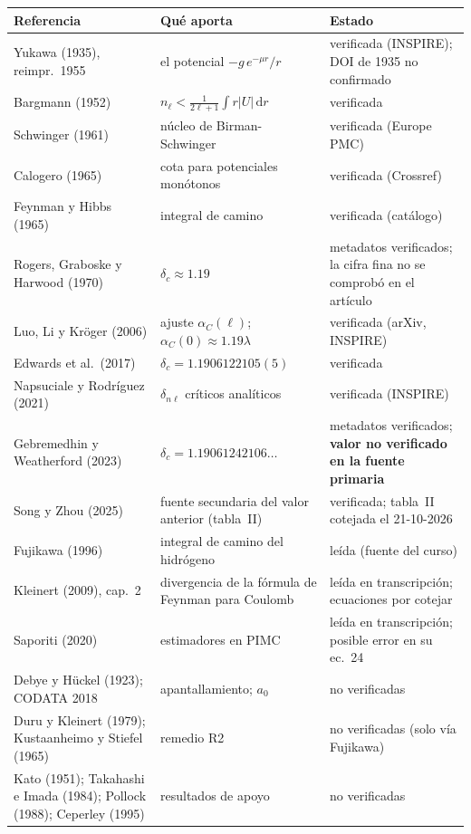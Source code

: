 \documentclass[11pt]{article}
\newcommand{\dd}{\mathrm{d}}
\newcommand{\dc}{\delta_c}
\begin{document}
\begin{longtable}{@{}L{5.4cm}L{4.2cm}L{4.0cm}@{}}
\toprule
\textbf{Referencia} & \textbf{Qué aporta} & \textbf{Estado}\\
\midrule
\endhead
Yukawa (1935), reimpr.\ 1955 \cite{Yukawa1935} & el potencial $-g\,e^{-\mu r}/r$ & verificada (INSPIRE); DOI de 1935 no confirmado\\
Bargmann (1952) \cite{Bargmann1952} & $n_\ell<\frac{1}{2\ell+1}\int r|U|\,\dd r$ & verificada\\
Schwinger (1961) \cite{Schwinger1961} & núcleo de Birman-Schwinger & verificada (Europe PMC)\\
Calogero (1965) \cite{Calogero1965} & cota para potenciales monótonos & verificada (Crossref)\\
Feynman y Hibbs (1965) \cite{FeynmanHibbs1965} & integral de camino & verificada (catálogo)\\
Rogers, Graboske y Harwood (1970) \cite{Rogers1970} & $\dc\approx1.19$ & metadatos verificados; la cifra fina no se comprobó en el artículo\\
Luo, Li y Kröger (2006) \cite{Luo2006} & ajuste $\alpha_C(\ell)$; $\alpha_C(0)\approx1.19\lambda$ & verificada (arXiv, INSPIRE)\\
Edwards et al.\ (2017) \cite{Edwards2017} & $\dc=1.1906122105(5)$ & verificada\\
Napsuciale y Rodríguez (2021) \cite{Napsuciale2021} & $\delta_{n\ell}$ críticos analíticos & verificada (INSPIRE)\\
Gebremedhin y Weatherford (2023) \cite{Gebremedhin2023} & $\dc=1.19061242106\ldots$ & metadatos verificados; \textbf{valor no verificado en la fuente primaria}\\
Song y Zhou (2025) \cite{Song2025} & fuente secundaria del valor anterior (tabla~II) & verificada; tabla~II cotejada el 21-10-2026\\
Fujikawa (1996) \cite{Fujikawa1996} & integral de camino del hidrógeno & leída (fuente del curso)\\
Kleinert (2009), cap.~2 \cite{Kleinert2009} & divergencia de la fórmula de Feynman para Coulomb & leída en transcripción; ecuaciones por cotejar\\
Saporiti (2020) \cite{Saporiti2020} & estimadores en PIMC & leída en transcripción; posible error en su ec.~24\\
Debye y Hückel (1923); CODATA 2018 & apantallamiento; $a_0$ & no verificadas\\
Duru y Kleinert (1979); Kustaanheimo y Stiefel (1965) & remedio R2 & no verificadas (solo vía Fujikawa)\\
Kato (1951); Takahashi e Imada (1984); Pollock (1988); Ceperley (1995) & resultados de apoyo & no verificadas\\
\bottomrule
\end{longtable}
\end{document}
